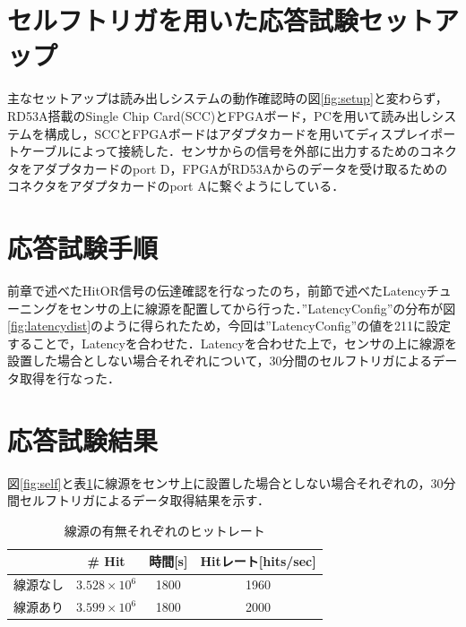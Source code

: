 \section{セルフトリガを用いた応答試験セットアップ}
\label{sec:selfsetup}
主なセットアップは読み出しシステムの動作確認時の図\ref{fig:setup}と変わらず，RD53A搭載のSingle Chip Card(SCC)とFPGAボード，PCを用いて読み出しシステムを構成し，SCCとFPGAボードはアダプタカードを用いてディスプレイポートケーブルによって接続した．センサからの信号を外部に出力するためのコネクタをアダプタカードのport D，FPGAがRD53Aからのデータを受け取るためのコネクタをアダプタカードのport Aに繋ぐようにしている．

\section{応答試験手順}
\label{sec:selfhow}
前章で述べたHitOR信号の伝達確認を行なったのち，前節で述べたLatencyチューニングをセンサの上に線源を配置してから行った．''LatencyConfig''の分布が図\ref{fig:latencydist}のように得られたため，今回は''LatencyConfig''の値を211に設定することで，Latencyを合わせた．Latencyを合わせた上で，センサの上に線源を設置した場合としない場合それぞれについて，30分間のセルフトリガによるデータ取得を行なった．

\section{応答試験結果}
\label{sec:selfconc}
図\ref{fig:self}と表\ref{tab:self}に線源をセンサ上に設置した場合としない場合それぞれの，30分間セルフトリガによるデータ取得結果を示す．

\begin{table}[h]
  \centering
  \caption{線源の有無それぞれのヒットレート}
  \begin{tabular} {|l|c|c||c|} \hline
     & \# Hit & 時間[s] & Hitレート[hits/sec] \\  \hline
    線源なし & $3.528 \times 10^6$ & 1800 & 1960 \\ 
    線源あり & $3.599 \times 10^6$ & 1800 & 2000 \\ \hline
  \end{tabular}
  \label{tab:self}
\end{table}


